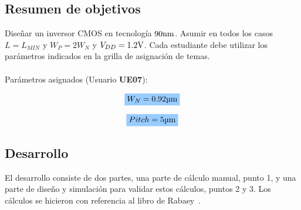 
\subsection{Resumen de objetivos}


\normalfont

Diseñar un inversor CMOS en tecnología $90 \si[per-mode=symbol]{\nano\meter}$. Asumir en todos los casos $L = L_{MIN}$ y $W_{P} = 2W_{N}$ y $V_{DD} = 1.2 \si[per-mode=symbol]{\volt}$. Cada estudiante debe utilizar los parámetros indicados en la grilla de asignación de temas.
\\\\


Parámetros asignados (Usuario \textbf{UE07}):


\begin{equation*}
\mathcolorbox{Lightblue}{ W_{N} = 0.92 \si[per-mode=symbol]{\micro\meter} }
\end{equation*}

\begin{equation*}
\mathcolorbox{Lightblue}{ Pitch = 5 \si[per-mode=symbol]{\micro\meter} }
\end{equation*}


\subsection{Desarrollo}


El desarrollo consiste de dos partes, una parte de cálculo manual, punto \num{1}, y una parte de diseño y simulación para validar estos cálculos, puntos \num{2} y \num{3}. Los cálculos se hicieron con referencia al libro de Rabaey~\cite{Rabaey2}.




\clearpage
